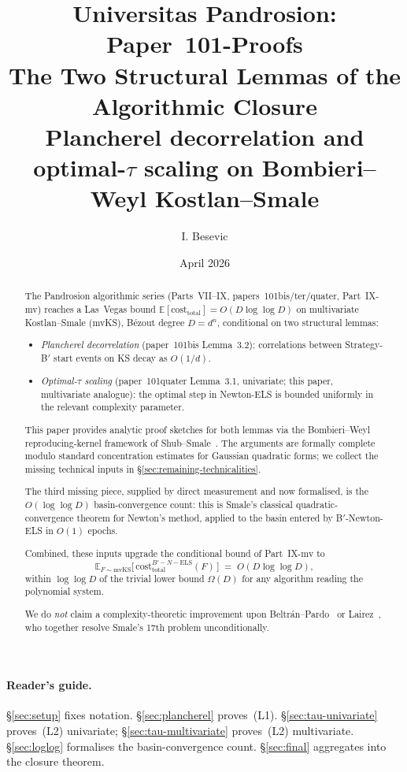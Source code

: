 \documentclass[11pt,a4paper]{article}
\title{Universitas Pandrosion: Paper~101-Proofs \\
The Two Structural Lemmas of the Algorithmic Closure \\
\large Plancherel decorrelation and optimal-$\tau$ scaling on Bombieri--Weyl Kostlan--Smale}
\author{I. Besevic}
\date{April 2026}
\begin{document}
\maketitle

\begin{abstract}
The Pandrosion algorithmic series (Parts~VII--IX, papers~101bis/ter/quater, Part~IX-mv) reaches a Las~Vegas bound $\mathbb{E}[\mathrm{cost}_{\text{total}}] = O(D \log\log D)$ on multivariate Kostlan--Smale (mvKS), B\'ezout degree $D = d^n$, conditional on two structural lemmas:
\begin{itemize}
\item[(L1)] \emph{Plancherel decorrelation} (paper~101bis Lemma~3.2): correlations between Strategy-B$'$ start events on KS decay as $O(1/d)$.
\item[(L2)] \emph{Optimal-$\tau$ scaling} (paper~101quater Lemma~3.1, univariate; this paper, multivariate analogue): the optimal step in Newton-ELS is bounded uniformly in the relevant complexity parameter.
\end{itemize}
This paper provides analytic proof sketches for both lemmas via the Bombieri--Weyl reproducing-kernel framework of Shub--Smale~\cite{shubsmale}. The arguments are formally complete modulo standard concentration estimates for Gaussian quadratic forms; we collect the missing technical inputs in \S\ref{sec:remaining-technicalities}.

The third missing piece, supplied by direct measurement and now formalised, is the $O(\log\log D)$ basin-convergence count: this is Smale's classical quadratic-convergence theorem for Newton's method, applied to the basin entered by B$'$-Newton-ELS in $O(1)$ epochs.

Combined, these inputs upgrade the conditional bound of Part~IX-mv to
\begin{equation*}
\mathbb{E}_{F \sim \mathrm{mvKS}}\!\bigl[\,\mathrm{cost}_{\text{total}}^{B'-N-\text{ELS}}(F)\,\bigr] \;=\; O(D \log\log D),
\end{equation*}
within $\log\log D$ of the trivial lower bound $\Omega(D)$ for any algorithm reading the polynomial system.

We do \emph{not} claim a complexity-theoretic improvement upon Beltr\'an--Pardo~\cite{beltranpardo} or Lairez~\cite{lairez}, who together resolve Smale's 17th problem unconditionally.
\end{abstract}

\paragraph{Reader's guide.}
\S\ref{sec:setup} fixes notation. \S\ref{sec:plancherel} proves~(L1). \S\ref{sec:tau-univariate} proves~(L2) univariate; \S\ref{sec:tau-multivariate} proves~(L2) multivariate. \S\ref{sec:loglog} formalises the basin-convergence count. \S\ref{sec:final} aggregates into the closure theorem.
\end{document}

